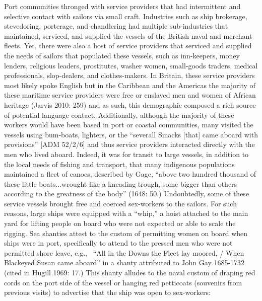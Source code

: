 \begin{styleStandard}
Port communities thronged with service providers that had intermittent and selective contact with sailors via small craft. Industries such as ship brokerage, stevedoring, porterage, and chandlering had multiple sub-industries that maintained, serviced, and supplied the vessels of the British naval and merchant fleets. Yet, there were also a host of service providers that serviced and supplied the needs of sailors that populated these vessels, such as inn-keepers, money lenders, religious leaders, prostitutes, washer women, small-goods traders, medical professionals, slop-dealers, and clothes-makers. In Britain, these service providers most likely spoke English but in the Caribbean and the Americas the majority of these maritime service providers were free or enslaved men and women of African heritage (Jarvis 2010: 259) and as such, this demographic composed a rich source of potential language contact. Additionally, although the majority of these workers would have been based in port or coastal communities, many visited the vessels using bum-boats, lighters, or the “severall Smacks [that] came aboard with provisions” [ADM 52/2/6] and thus service providers interacted directly with the men who lived aboard. Indeed, it was for transit to large vessels, in addition to the local needs of fishing and transport, that many indigenous populations maintained a fleet of canoes, described by Gage, “above two hundred thousand of these little boats...wrought like a kneading trough, some bigger than others according to the greatness of the body” (1648: 50.) Undoubtedly, some of these service vessels brought free and coerced sex-workers to the sailors. For such reasons, large ships were equipped with a “whip,” a hoist attached to the main yard for lifting people on board who were not expected or able to scale the rigging. Sea shanties attest to the custom of permitting women on board when ships were in port, specifically to attend to the pressed men who were not permitted shore leave, e.g., \ “All in the Downs the Fleet lay moored, / When Blackeyed Susan came aboard” in a shanty attributed to John Gay 1685-1732 (cited in Hugill 1969: 17.) This shanty alludes to the naval custom of draping red cords on the port side of the vessel or hanging red petticoats (souvenirs from previous visits) to advertise that the ship was open to sex-workers: 
\end{styleStandard}


